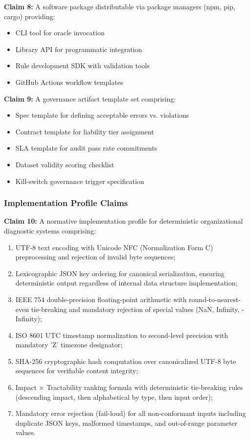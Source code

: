 \documentclass[11pt,a4paper]{article}
\begin{document}
\textbf{Claim 8:} A software package distributable via package managers (npm, pip, cargo) providing:
\begin{itemize}
\item CLI tool for oracle invocation
\item Library API for programmatic integration
\item Rule development SDK with validation tools
\item GitHub Actions workflow templates
\end{itemize}

\textbf{Claim 9:} A governance artifact template set comprising:
\begin{itemize}
\item Spec template for defining acceptable errors vs. violations
\item Contract template for liability tier assignment
\item SLA template for audit pass rate commitments
\item Dataset validity scoring checklist
\item Kill-switch governance trigger specification
\end{itemize}
\subsubsection{Implementation Profile Claims}

\textbf{Claim 10:} A normative implementation profile for deterministic 
organizational diagnostic systems comprising:
\begin{enumerate}
\item UTF-8 text encoding with Unicode NFC (Normalization Form C) 
preprocessing and rejection of invalid byte sequences;

\item Lexicographic JSON key ordering for canonical serialization, 
ensuring deterministic output regardless of internal data structure 
implementation;

\item IEEE 754 double-precision floating-point arithmetic with 
round-to-nearest-even tie-breaking and mandatory rejection of 
special values (NaN, Infinity, -Infinity);

\item ISO 8601 UTC timestamp normalization to second-level precision 
with mandatory 'Z' timezone designator;

\item SHA-256 cryptographic hash computation over canonicalized UTF-8 
byte sequences for verifiable content integrity;

\item Impact × Tractability ranking formula with deterministic 
tie-breaking rules (descending impact, then alphabetical by type, 
then input order);

\item Mandatory error rejection (fail-loud) for all non-conformant 
inputs including duplicate JSON keys, malformed timestamps, and 
out-of-range parameter values.
\end{enumerate}
\end{document}
